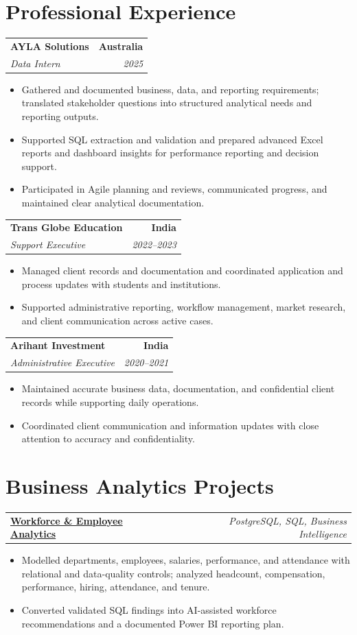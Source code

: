 \documentclass[letterpaper,10pt]{article}
\makeatletter
\newcommand{\role}[4]{%
  \begin{tabularx}{\textwidth}{@{}Xr@{}}
    \textbf{#1} & \textbf{#2} \\
    \textit{#3} & \textit{#4}
  \end{tabularx}\vspace{-1pt}
}
\newcommand{\project}[2]{%
  \begin{tabularx}{\textwidth}{@{}Xr@{}}
    \textbf{#1} & \textit{#2}
  \end{tabularx}\vspace{-1pt}
}
\makeatother
\begin{document}
\section{Professional Experience}
\role{AYLA Solutions}{Australia}{Data Intern}{2025}
\begin{itemize}
  \item Gathered and documented business, data, and reporting requirements; translated stakeholder questions into structured analytical needs and reporting outputs.
  \item Supported SQL extraction and validation and prepared advanced Excel reports and dashboard insights for performance reporting and decision support.
  \item Participated in Agile planning and reviews, communicated progress, and maintained clear analytical documentation.
\end{itemize}
\vspace{1pt}

\role{Trans Globe Education}{India}{Support Executive}{2022--2023}
\begin{itemize}
  \item Managed client records and documentation and coordinated application and process updates with students and institutions.
  \item Supported administrative reporting, workflow management, market research, and client communication across active cases.
\end{itemize}
\vspace{1pt}

\role{Arihant Investment}{India}{Administrative Executive}{2020--2021}
\begin{itemize}
  \item Maintained accurate business data, documentation, and confidential client records while supporting daily operations.
  \item Coordinated client communication and information updates with close attention to accuracy and confidentiality.
\end{itemize}

\section{Business Analytics Projects}
\project{\href{https://github.com/jainalimehta/HR-Analytics}{Workforce \& Employee Analytics}}{PostgreSQL, SQL, Business Intelligence}
\begin{itemize}
  \item Modelled departments, employees, salaries, performance, and attendance with relational and data-quality controls; analyzed headcount, compensation, performance, hiring, attendance, and tenure.
  \item Converted validated SQL findings into AI-assisted workforce recommendations and a documented Power BI reporting plan.
\end{itemize}
\vspace{1pt}
\end{document}
